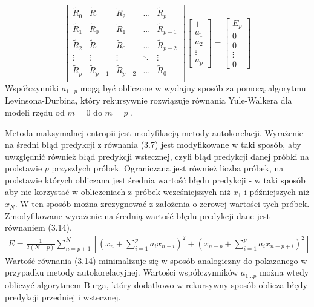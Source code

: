 \documentclass[notitlepage]{report}
\begin{document}
\begin{equation}
\begin{bmatrix}
\tilde{R}_0 & \tilde{R}_1 & \tilde{R}_2 & ... & \tilde{R}_p \\
\tilde{R}_1 & \tilde{R}_0 & \tilde{R}_1 & ... & \tilde{R}_{p-1} \\
\tilde{R}_2 & \tilde{R}_1 & \tilde{R}_0 & ... & \tilde{R}_{p-2} \\
\vdots & \vdots & \vdots & \ddots & \vdots \\
\tilde{R}_p & \tilde{R}_{p-1} & \tilde{R}_{p-2} & ... & \tilde{R}_0 \\
\end{bmatrix}
\begin{bmatrix}
1 \\ a_1 \\ a_2 \\ \vdots \\ a_p
\end{bmatrix} = 
\begin{bmatrix}
E_p \\ 0 \\ 0 \\ \vdots \\ 0
\end{bmatrix}
\end{equation}
Współczynniki $a_{1...p}$ mogą być obliczone w wydajny sposób za pomocą algorytmu Levinsona-Durbina, który rekursywnie rozwiązuje równania Yule-Walkera dla modeli rzędu od $m=0$ do $m=p$ \cite{pardey} \cite{stoica}. 

Metoda maksymalnej entropii jest modyfikacją metody autokorelacji. Wyrażenie na średni błąd predykcji z równania (3.7) jest modyfikowane w taki sposób, aby uwzględnić również błąd predykcji wstecznej, czyli błąd predykcji danej próbki na podstawie $p$ przyszłych próbek. Ograniczana jest również liczba próbek, na podstawie których obliczana jest średnia wartość błędu predykcji - w taki sposób aby nie korzystać w obliczeniach z próbek wcześniejszych niż $x_1$ i późniejszych niż $x_N$. W ten sposób można zrezygnować z założenia o zerowej wartości tych próbek. Zmodyfikowane wyrażenie na średnią wartość błędu predykcji dane jest równaniem (3.14).
\begin{equation}
\begin{split}
E = \frac{1}{2(N-p)}\sum_{n=p+1}^{N}\left[\left(x_n + \sum_{i=1}^{p}a_ix_{n-i}\right)^2 + \left(x_{n-p} + \sum_{i=1}^{p}a_ix_{n-p+i}  \right)^2\right]
\end{split}
\end{equation}
Wartość równania (3.14) minimalizuje się w sposób analogiczny do pokazanego w przypadku metody autokorelacyjnej. Wartości współczynników $a_{1...p}$ można wtedy obliczyć algorytmem Burga, który dodatkowo w rekursywny sposób oblicza błędy predykcji przedniej i wstecznej.
\end{document}
